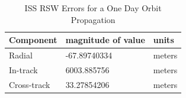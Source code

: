 \begin{description}
\begin{table}[htb]
\begin{center}
\caption{ISS RSW Errors for a One Day Orbit Propagation} \vspace{5mm}
\label{tbl:isserror1}
\begin{tabular}{||l|l|l|} \hline
{\bf Component  } & {\bf magnitude of value} & {\bf units } \\ \hline \hline
Radial      & -67.89740334          & meters \\ \hline
In-track    & 6003.885756       & meters  \\ \hline
Cross-track & 33.27854206        & meters \\ \hline
\end{tabular}
\end{center}
\end{table}

\clearpage
\newpage
\end{description}

